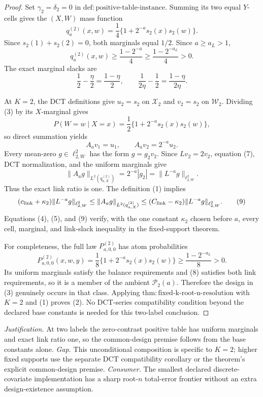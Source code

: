 \documentclass{article}
\begin{document}
\begin{proof}
Set \(\gamma_2=\delta_2=0\) in \(\mathrm{def:positive\mbox{-}table\mbox{-}instance}\). Summing its two equal \(Y\)-cells gives the \((X,W)\) mass function
\[
q_a^{(2)}(x,w)=\frac14\{1+2^{-a}s_2(x)s_2(w)\}.
\tag{3}
\]
Since \(s_2(1)+s_2(2)=0\), both marginals equal \(1/2\). Since \(a\ge a_L>1\),
\[
q_a^{(2)}(x,w)
\ge\frac{1-2^{-a}}4
\ge\frac{1-2^{-a_L}}4>0.
\tag{4}
\]
The exact marginal slacks are
\[
\frac12-\frac\eta2=\frac{1-\eta}{2},
\qquad
\frac1{2\eta}-\frac12=\frac{1-\eta}{2\eta}.
\tag{5}
\]

At \(K=2\), the DCT definitions give \(u_2=s_2\) on \(\mathcal X_2\) and \(v_2=s_2\) on \(\mathcal W_2\). Dividing (3) by its \(X\)-marginal gives
\[
P(W=w\mid X=x)=\frac12\{1+2^{-a}s_2(x)s_2(w)\},
\tag{6}
\]
so direct summation yields
\[
A_a v_1=u_1,
\qquad
A_av_2=2^{-a}u_2.
\tag{7}
\]
Every mean-zero \(g\in\ell^2_{2,W}\) has the form \(g=g_2v_2\). Since \(Lv_2=2v_2\), equation (7), DCT normalization, and the uniform marginals give
\[
\|A_ag\|_{L^2(q_{a,X}^{(2)})}
=2^{-a}|g_2|
=\|L^{-a}g\|_{\ell^2_{2,W}}.
\tag{8}
\]
Thus the exact link ratio is one. The definition (1) implies
\[
(c_{\rm link}+\kappa_2)\|L^{-a}g\|_{\ell^2_{2,W}}
\le\|A_ag\|_{L^2(q_{a,X}^{(2)})}
\le(C_{\rm link}-\kappa_2)\|L^{-a}g\|_{\ell^2_{2,W}}.
\tag{9}
\]
Equations (4), (5), and (9) verify, with the one constant \(\kappa_2\) chosen before \(a\), every cell, marginal, and link-slack inequality in the fixed-support theorem.

For completeness, the full law \(P^{(2)}_{a,0,0}\) has atom probabilities
\[
P^{(2)}_{a,0,0}(x,w,y)
=\frac18\{1+2^{-a}s_2(x)s_2(w)\}
\ge\frac{1-2^{-a_L}}8>0.
\tag{10}
\]
Its uniform marginals satisfy the balance requirements and (8) satisfies both link requirements, so it is a member of the ambient \(\mathcal P_2(a)\). Therefore the design in (3) genuinely occurs in that class. Applying \(\mathrm{thm:fixed\mbox{-}k\mbox{-}root\mbox{-}n\mbox{-}resolution}\) with \(K=2\) and (1) proves (2). No DCT-series compatibility condition beyond the declared base constants is needed for this two-label conclusion.
\end{proof}
\par\smallskip\noindent \textit{Justification.} At two labels the zero-contrast positive table has uniform marginals and exact link ratio one, so the common-design premise follows from the base constants alone. \textit{Gap.} This unconditional composition is specific to \(K=2\); higher fixed supports use the separate DCT compatibility corollary or the theorem's explicit common-design premise. \textit{Consumer.} The smallest declared discrete-covariate implementation has a sharp root-\(n\) total-error frontier without an extra design-existence assumption.
\end{document}
